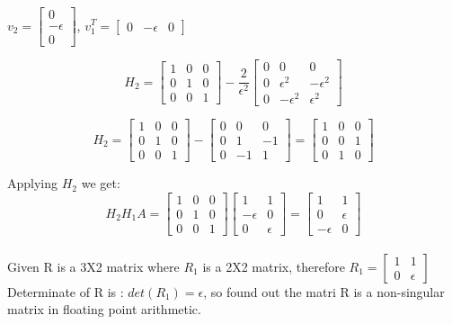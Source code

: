\documentclass[12pt, oneside]{article}   	%
\begin{document}
\begin{enumerate}
\begin{enumerate}
	
		$v_2=\left [\begin{array}{c} 0\\-\epsilon\\
		0\end{array}\right]$, $v_1^T=\left [\begin{array}{ccc} 0&-\epsilon&0\end{array}\right]$
		
		$$H_2=\left [\begin{array}{ccc} 1&0&0\\0&1&0\\0&0&1\end{array}\right]- \frac{2}{\epsilon^2}
		\left [\begin{array}{ccc} 0&0&0\\0&\epsilon^2&-\epsilon^2\\0&-\epsilon^2&\epsilon^2\end{array}\right]$$
		
		$$H_2=\left [\begin{array}{ccc} 1&0&0\\0&1&0\\0&0&1\end{array}\right]- 
		\left [\begin{array}{ccc} 0&0&0\\0&1&-1\\0&-1&1\end{array}\right]= \left [\begin{array}{ccc} 1&0&0\\0&0&1\\0&1&0\end{array}\right]$$
		
		Applying $ H_2$ we get:\\
		$$H_2H_1A=\left [\begin{array}{ccc} 1&0&0\\0&1&0\\0&0&1\end{array}\right]\left [\begin{array}{cc} 1&1\\-\epsilon&0\\0&\epsilon\end{array}\right]=\left [\begin{array}{cc} 1&1\\0&\epsilon\\-\epsilon&0\end{array}\right]$$\\
		
		Given R is a 3X2 matrix where $R_1$ is a 2X2 matrix, therefore $R_1=\left [\begin{array}{cc} 1&1\\0&\epsilon\end{array}\right]$\\
		Determinate of R is : $det(R_1)= \epsilon$, so found out the matri R is a non-singular matrix in floating point arithmetic.\\


\end{enumerate}
\end{enumerate}
\end{document}
